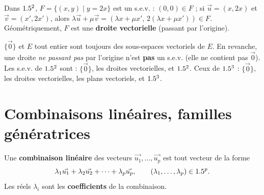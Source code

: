 \begin{exemple}
Dans $1.5^2$, $F=\{(x,y)\mid y=2x\}$ est un s.e.v. : $(0,0)\in F$ ; si $\vec u=(x,2x)$ et
$\vec v=(x',2x')$, alors $\lambda\vec u+\mu\vec v=(\lambda x+\mu x',\,2(\lambda x+\mu x'))\in F$.
Géométriquement, $F$ est une \textbf{droite vectorielle} (passant par l'origine).
\end{exemple}

\begin{remarque}
$\{\vec 0\}$ et $E$ tout entier sont toujours des sous-espaces vectoriels de $E$. En revanche,
une droite \emph{ne passant pas} par l'origine n'est \textbf{pas} un s.e.v. (elle ne contient
pas $\vec 0$). Les s.e.v. de $1.5^2$ sont : $\{\vec 0\}$, les droites vectorielles, et $1.5^2$.
Ceux de $1.5^3$ : $\{\vec 0\}$, les droites vectorielles, les plans vectoriels, et $1.5^3$.
\end{remarque}

\begin{illus}
\end{illus}

\section{Combinaisons linéaires, familles génératrices}

\begin{definition}
Une \textbf{combinaison linéaire} des vecteurs $\vec{u_1},\dots,\vec{u_p}$ est tout vecteur de la forme
\[
\lambda_1\vec{u_1}+\lambda_2\vec{u_2}+\dots+\lambda_p\vec{u_p},\qquad (\lambda_1,\dots,\lambda_p)\in1.5^p.
\]
Les réels $\lambda_i$ sont les \textbf{coefficients} de la combinaison.
\end{definition}

